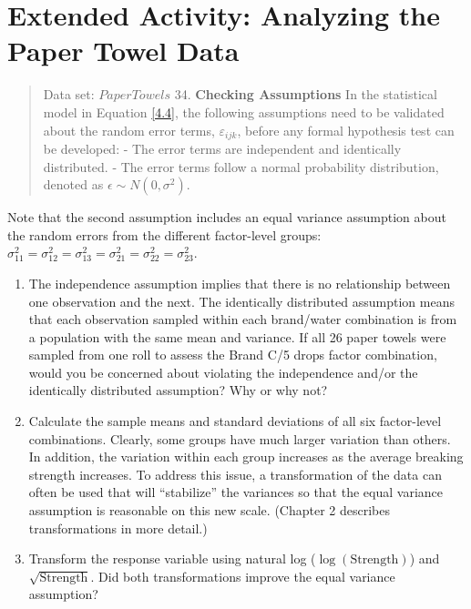 \documentclass[
]{report}
\begin{document}
\hypertarget{extended-activity-analyzing-the-paper-towel-data}{%
\section*{Extended Activity: Analyzing the Paper Towel Data}\label{extended-activity-analyzing-the-paper-towel-data}}

\begin{quote}
Data set: \(PaperTowels\)
34. \textbf{Checking Assumptions} In the statistical model in Equation \ref{4.4}, the following assumptions need to be validated about the random error terms, \(\varepsilon_{ijk}\), before any formal hypothesis test can be developed:
- The error terms are independent and identically distributed.
- The error terms follow a normal probability distribution, denoted as \(\epsilon \sim N(0, \sigma^2)\).
\end{quote}

Note that the second assumption includes an equal variance assumption about the random errors from the different factor-level groups: \(\sigma_{11}^2 = \sigma_{12}^2 = \sigma_{13}^2 = \sigma_{21}^2 = \sigma_{22}^2 = \sigma_{23}^2\).

\begin{enumerate}
\def\labelenumi{\alph{enumi}.}
\item
  The independence assumption implies that there is no relationship between one observation and the next. The identically distributed assumption means that each observation sampled within each brand/water combination is from a population with the same mean and variance. If all 26 paper towels were sampled from one roll to assess the Brand C/5 drops factor combination, would you be concerned about violating the independence and/or the identically distributed assumption? Why or why not?
\item
  Calculate the sample means and standard deviations of all six factor-level combinations. Clearly, some groups have much larger variation than others. In addition, the variation within each group increases as the average breaking strength increases. To address this issue, a transformation of the data can often be used that will ``stabilize'' the variances so that the equal variance assumption is reasonable on this new scale. (Chapter 2 describes transformations in more detail.)
\item
  Transform the response variable using natural log (\(\log(\text{Strength})\)) and \(\sqrt{\text{Strength}}\). Did both transformations improve the equal variance assumption?
\end{enumerate}
\end{document}
